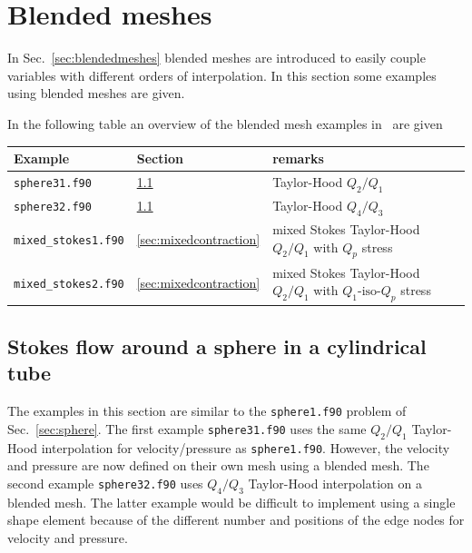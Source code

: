 
\def\headdate{12th November 2021}

\section{Blended meshes}
\label{sec:blendexamples}

In Sec.~\ref{sec:blendedmeshes} blended meshes are introduced to
easily couple variables with different orders of interpolation. 
In this section some examples using blended meshes are given.

In the following table an overview of the blended mesh examples in \tfem\ are given\medskip

\begin{tabular}{lll}
Example & Section & remarks \\\hline
 \texttt{sphere31.f90} & \ref{sec:stokes31} & Taylor-Hood  $Q_2/Q_1$  \\
 \texttt{sphere32.f90} & \ref{sec:stokes31} & Taylor-Hood  $Q_4/Q_3$  \\
 \texttt{mixed\_stokes1.f90} & \ref{sec:mixedcontraction} & mixed Stokes Taylor-Hood $Q_2/Q_1$ with $Q_p$ stress \\
 \texttt{mixed\_stokes2.f90} & \ref{sec:mixedcontraction} & mixed Stokes Taylor-Hood $Q_2/Q_1$ with $Q_1\text{-iso-}Q_p$ stress \\
\end{tabular}


\subsection{Stokes flow around a sphere in a cylindrical tube}
\label{sec:stokes31}

The examples in this section are similar to the \texttt{sphere1.f90} problem 
of Sec.~\ref{sec:sphere}.
The first example \texttt{sphere31.f90} uses the same  $Q_2/Q_1$  Taylor-Hood
interpolation for velocity/pressure as \texttt{sphere1.f90}. However,
the velocity and pressure are now defined on their own mesh using a blended
mesh. The second example \texttt{sphere32.f90} uses $Q_4/Q_3$ Taylor-Hood
interpolation on a blended mesh. The latter example would be difficult to
implement using a single shape element because of the different number and
positions of the edge nodes for velocity and pressure.
